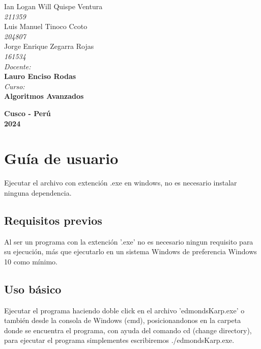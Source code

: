 \documentclass[a4paper]{article}
\begin{document}
\begin{titlepage}
    {\large Ian Logan Will Quispe Ventura}\\
    \textit{211359}\\[0.1cm]

    {\large Luis Manuel Tinoco Ccoto}\\
    \textit{204807}\\[0.1cm]

    {\large Jorge Enrique Zegarra Rojas }\\
    \textit{161534}\\[0.1cm]

\vspace{0.1cm}
    \textit{\Large Docente:}\\
    \textbf{\large Lauro Enciso Rodas}\\
\vspace{0.5cm}
    \textit{\Large Curso:}\\
    \textbf{\large Algoritmos Avanzados}\\
    \vfill

\vspace{0.5cm}
\textbf{\Large Cusco - Perú }\\
    \textbf{\large 2024}\\
    \newpage
    \end{titlepage}

\restoregeometry
\newpage
\section{Guía de usuario}
Ejecutar el archivo con extención .exe en windows, no es necesario instalar ninguna dependencia.

\subsection{Requisitos previos}
Al ser un programa con la extención '.exe' no es necesario ningun requisito para su ejecución, más que ejecutarlo en un sistema Windows de preferencia Windows 10 como mínimo.

\subsection{Uso básico}
Ejecutar el programa haciendo doble click en el archivo 'edmondsKarp.exe' o también desde la consola de Windows (cmd), posicionandonos en la carpeta donde se encuentra el programa, con ayuda del comando cd (change directory), para ejecutar el programa simplementes escribiremos ./edmondsKarp.exe.
\end{document}
